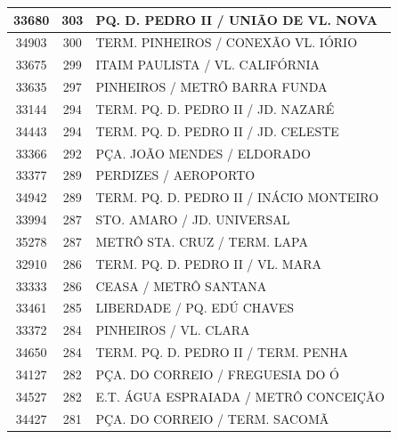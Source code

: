 \documentclass[
	12pt,				%
	oneside,			%
	a4paper,			%
	english,			%
	brazil				%
	]{abntex2ppgsi}
\begin{document}
{{\begin{apendicesenv}
\begin{longtable}{c|c|p{7cm}}
    33680 & 303   & PQ. D. PEDRO II / UNIÃO DE VL. NOVA \\
\hline

    34903 & 300   & TERM. PINHEIROS / CONEXÃO VL. IÓRIO \\
\hline

    33675 & 299   & ITAIM PAULISTA / VL. CALIFÓRNIA \\
\hline

    33635 & 297   & PINHEIROS / METRÔ BARRA FUNDA \\
\hline

    33144 & 294   & TERM. PQ. D. PEDRO II / JD. NAZARÉ \\
\hline

    34443 & 294   & TERM. PQ. D. PEDRO II / JD. CELESTE \\
\hline

    33366 & 292   & PÇA. JOÃO MENDES / ELDORADO \\
\hline

    33377 & 289   & PERDIZES / AEROPORTO \\
\hline

    34942 & 289   & TERM. PQ. D. PEDRO II / INÁCIO MONTEIRO \\
\hline

    33994 & 287   & STO. AMARO / JD. UNIVERSAL \\
\hline

    35278 & 287   & METRÔ STA. CRUZ / TERM. LAPA \\
\hline

    32910 & 286   & TERM. PQ. D. PEDRO II / VL. MARA \\
\hline

    33333 & 286   & CEASA / METRÔ SANTANA \\
\hline

    33461 & 285   & LIBERDADE / PQ. EDÚ CHAVES \\
\hline

    33372 & 284   & PINHEIROS / VL. CLARA \\
\hline

    34650 & 284   & TERM. PQ. D. PEDRO II / TERM. PENHA \\
\hline

    34127 & 282   & PÇA. DO CORREIO / FREGUESIA DO Ó \\
\hline

    34527 & 282   & E.T. ÁGUA ESPRAIADA / METRÔ CONCEIÇÃO \\
\hline

    34427 & 281   & PÇA. DO CORREIO / TERM. SACOMÃ \\
\hline


\end{longtable}
\end{apendicesenv}}}
\end{document}
